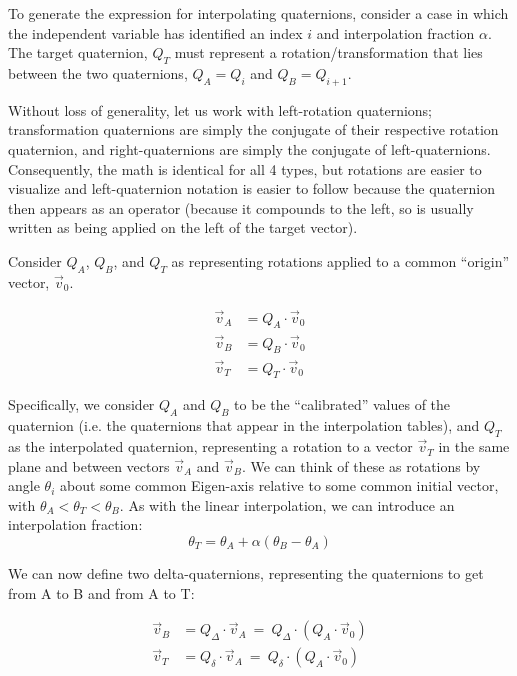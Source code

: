 \documentclass[11pt,fleqn]{report}
\begin{document}
To generate the expression for interpolating quaternions, consider a case in
which the independent variable has identified an index $i$ and
interpolation fraction $\alpha$.  The target
quaternion, $Q_T$ must represent a rotation/transformation that lies between
the two quaternions, $Q_A = Q_i$ and $Q_B = Q_{i+1}$.

Without loss of generality, let us work with left-rotation quaternions;
transformation quaternions are simply the conjugate of their respective
rotation quaternion, and right-quaternions are simply the conjugate of
left-quaternions. Consequently, the math is identical for all 4 types, but
rotations are easier to visualize and left-quaternion notation is easier to
follow because the quaternion then appears as an operator (because it compounds
to the left, so is usually written as being applied on the left of the target
vector).

Consider $Q_A$, $Q_B$, and $Q_T$ as representing rotations applied to a
common ``origin'' vector, $\vec v_0$.

\begin{align*}
 \vec v_A &= Q_A \cdot \vec v_0 \\
 \vec v_B &= Q_B \cdot \vec v_0 \\
 \vec v_T &= Q_T \cdot \vec v_0
\end{align*}

Specifically, we consider $Q_A$ and $Q_B$ to be the ``calibrated'' values
of the quaternion (i.e. the quaternions that appear in the interpolation
tables), and $Q_T$ as the interpolated quaternion, representing a rotation to
a vector $\vec v_T$ in the same plane and between vectors $\vec v_A$ and
$\vec v_B$.
We can think of these as rotations by angle $\theta_i$ about some common
Eigen-axis relative to some common initial vector, with
$\theta_A < \theta_T < \theta_B$. As with the linear
interpolation, we can introduce an interpolation fraction:
\begin{equation*}
 \theta_T = \theta_A + \alpha( \theta_B - \theta_A)
\end{equation*}

We can now define two delta-quaternions, representing the quaternions to
get from A to B and from A to T:

\begin{align*}
 \vec v_B &= Q_\Delta \cdot \vec v_A ~=~ Q_\Delta \cdot  (Q_A \cdot \vec v_0)
  \\
 \vec v_T &= Q_\delta \cdot \vec v_A ~=~ Q_\delta \cdot  (Q_A \cdot \vec v_0)
\end{align*}
\end{document}

